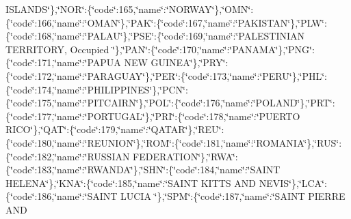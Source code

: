 {I\-S\-L\-A\-N\-D\-S\char`\"{}\},\char`\"{}N\-O\-R\char`\"{}\-:\{\char`\"{}code\char`\"{}\-:165,\char`\"{}name\char`\"{}\-:\char`\"{}N\-O\-R\-W\-A\-Y\char`\"{}\},\char`\"{}O\-M\-N\char`\"{}\-:\{\char`\"{}code\char`\"{}\-:166,\char`\"{}name\char`\"{}\-:\char`\"{}O\-M\-A\-N\char`\"{}\},\char`\"{}P\-A\-K\char`\"{}\-:\{\char`\"{}code\char`\"{}\-:167,\char`\"{}name\char`\"{}\-:\char`\"{}P\-A\-K\-I\-S\-T\-A\-N\char`\"{}\},\char`\"{}P\-L\-W\char`\"{}\-:\{\char`\"{}code\char`\"{}\-:168,\char`\"{}name\char`\"{}\-:\char`\"{}P\-A\-L\-A\-U\char`\"{}\},\char`\"{}P\-S\-E\char`\"{}\-:\{\char`\"{}code\char`\"{}\-:169,\char`\"{}name\char`\"{}\-:\char`\"{}P\-A\-L\-E\-S\-T\-I\-N\-I\-A\-N T\-E\-R\-R\-I\-T\-O\-R\-Y, Occupied \char`\"{}\},\char`\"{}P\-A\-N\char`\"{}\-:\{\char`\"{}code\char`\"{}\-:170,\char`\"{}name\char`\"{}\-:\char`\"{}P\-A\-N\-A\-M\-A\char`\"{}\},\char`\"{}P\-N\-G\char`\"{}\-:\{\char`\"{}code\char`\"{}\-:171,\char`\"{}name\char`\"{}\-:\char`\"{}P\-A\-P\-U\-A N\-E\-W G\-U\-I\-N\-E\-A\char`\"{}\},\char`\"{}P\-R\-Y\char`\"{}\-:\{\char`\"{}code\char`\"{}\-:172,\char`\"{}name\char`\"{}\-:\char`\"{}P\-A\-R\-A\-G\-U\-A\-Y\char`\"{}\},\char`\"{}P\-E\-R\char`\"{}\-:\{\char`\"{}code\char`\"{}\-:173,\char`\"{}name\char`\"{}\-:\char`\"{}P\-E\-R\-U\char`\"{}\},\char`\"{}P\-H\-L\char`\"{}\-:\{\char`\"{}code\char`\"{}\-:174,\char`\"{}name\char`\"{}\-:\char`\"{}P\-H\-I\-L\-I\-P\-P\-I\-N\-E\-S\char`\"{}\},\char`\"{}P\-C\-N\char`\"{}\-:\{\char`\"{}code\char`\"{}\-:175,\char`\"{}name\char`\"{}\-:\char`\"{}P\-I\-T\-C\-A\-I\-R\-N\char`\"{}\},\char`\"{}P\-O\-L\char`\"{}\-:\{\char`\"{}code\char`\"{}\-:176,\char`\"{}name\char`\"{}\-:\char`\"{}P\-O\-L\-A\-N\-D\char`\"{}\},\char`\"{}P\-R\-T\char`\"{}\-:\{\char`\"{}code\char`\"{}\-:177,\char`\"{}name\char`\"{}\-:\char`\"{}P\-O\-R\-T\-U\-G\-A\-L\char`\"{}\},\char`\"{}P\-R\-I\char`\"{}\-:\{\char`\"{}code\char`\"{}\-:178,\char`\"{}name\char`\"{}\-:\char`\"{}P\-U\-E\-R\-T\-O R\-I\-C\-O\char`\"{}\},\char`\"{}Q\-A\-T\char`\"{}\-:\{\char`\"{}code\char`\"{}\-:179,\char`\"{}name\char`\"{}\-:\char`\"{}Q\-A\-T\-A\-R\char`\"{}\},\char`\"{}R\-E\-U\char`\"{}\-:\{\char`\"{}code\char`\"{}\-:180,\char`\"{}name\char`\"{}\-:\char`\"{}R\-E\-U\-N\-I\-O\-N\char`\"{}\},\char`\"{}R\-O\-M\char`\"{}\-:\{\char`\"{}code\char`\"{}\-:181,\char`\"{}name\char`\"{}\-:\char`\"{}R\-O\-M\-A\-N\-I\-A\char`\"{}\},\char`\"{}R\-U\-S\char`\"{}\-:\{\char`\"{}code\char`\"{}\-:182,\char`\"{}name\char`\"{}\-:\char`\"{}R\-U\-S\-S\-I\-A\-N F\-E\-D\-E\-R\-A\-T\-I\-O\-N\char`\"{}\},\char`\"{}R\-W\-A\char`\"{}\-:\{\char`\"{}code\char`\"{}\-:183,\char`\"{}name\char`\"{}\-:\char`\"{}R\-W\-A\-N\-D\-A\char`\"{}\},\char`\"{}S\-H\-N\char`\"{}\-:\{\char`\"{}code\char`\"{}\-:184,\char`\"{}name\char`\"{}\-:\char`\"{}S\-A\-I\-N\-T H\-E\-L\-E\-N\-A\char`\"{}\},\char`\"{}K\-N\-A\char`\"{}\-:\{\char`\"{}code\char`\"{}\-:185,\char`\"{}name\char`\"{}\-:\char`\"{}S\-A\-I\-N\-T K\-I\-T\-T\-S A\-N\-D N\-E\-V\-I\-S\char`\"{}\},\char`\"{}L\-C\-A\char`\"{}\-:\{\char`\"{}code\char`\"{}\-:186,\char`\"{}name\char`\"{}\-:\char`\"{}S\-A\-I\-N\-T L\-U\-C\-I\-A \char`\"{}\},\char`\"{}S\-P\-M\char`\"{}\-:\{\char`\"{}code\char`\"{}\-:187,\char`\"{}name\char`\"{}\-:\char`\"{}S\-A\-I\-N\-T P\-I\-E\-R\-R\-E A\-N\-D }
